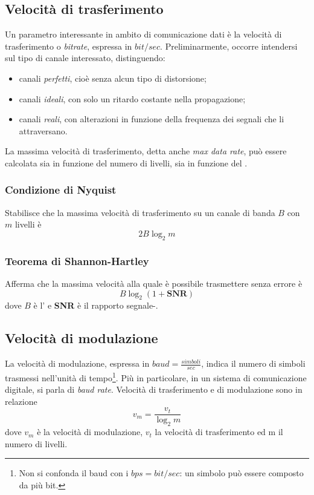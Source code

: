 \documentclass[a4paper,11pt]{article}
\def\subsub#1{\subsubsection{#1}\label{#1}}
\def\vedi#1{\nameref{#1}}
\begin{document}
\subsection{Velocità di trasferimento}
Un parametro interessante in ambito di comunicazione dati è la velocità di trasferimento o \textit{bitrate}, espressa in $bit/sec$. Preliminarmente, occorre intendersi sul tipo di canale interessato, distinguendo:
\begin{itemize}
\item canali \textit{perfetti}, cioè senza alcun tipo di distorsione;
\item canali \textit{ideali}, con solo un ritardo costante nella propagazione;
\item canali \textit{reali}, con alterazioni in funzione della frequenza dei segnali che li attraversano.
\end{itemize}
La massima velocità di trasferimento, detta anche \textit{max data rate}, può essere calcolata sia in funzione del numero di livelli, sia in funzione del \vedi{Rumore}.
\subsub{Condizione di Nyquist}
Stabilisce che la massima velocità di trasferimento su un canale di banda $B$ con $m$ livelli è
\[2B\log_{2}m\]

\subsub{Teorema di Shannon-Hartley}
Afferma che la massima velocità alla quale è possibile trasmettere senza errore è
\[B\log_{2}(1+\textbf{SNR})\]
dove $B$ è l'\vedi{Ampiezza di banda} e \textbf{SNR} è il rapporto segnale-\vedi{Rumore}.
\subsection{Velocità di modulazione}
La velocità di modulazione, espressa in $baud=\frac{simboli}{sec}$, indica il numero di simboli trasmessi nell'unità di tempo\footnote{Non si confonda il baud con i $bps=bit/sec$: un simbolo può essere composto da più bit.}. Più in particolare, in un sistema di comunicazione digitale, si parla di \textit{baud rate}.
Velocità di trasferimento e di modulazione sono in relazione 
\[v_{m}=\frac{v_{t}}{\log_{2}m}\]
dove $v_{m}$ è la velocità di modulazione, $v_{t}$ la velocità di trasferimento ed m il numero di livelli.
\end{document}
